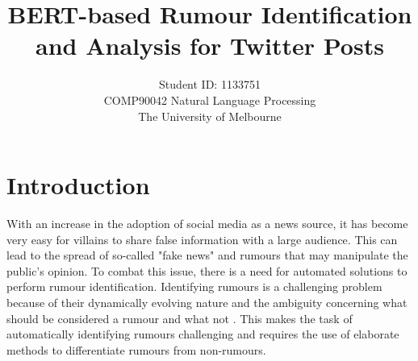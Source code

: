 \documentclass[11pt,a4paper]{article}
\title{BERT-based Rumour Identification and Analysis for Twitter Posts}
\author{ Student ID: 1133751 \\
 COMP90042 Natural Language Processing \\
 The University of Melbourne
}
\date{}
\begin{document}
\maketitle

\section{Introduction}
With an increase in the adoption of social media as a news source, it has become very easy for villains to share false information with a large audience. This can lead to the spread of so-called "fake news" and rumours that may manipulate the public's opinion. To combat this issue, there is a need for automated solutions to perform rumour identification.
\newline
Identifying rumours is a challenging problem because of their dynamically evolving nature and the ambiguity concerning what should be considered a rumour and what not \citep{RN675}. This makes the task of automatically identifying rumours challenging and requires the use of elaborate methods to differentiate rumours from non-rumours. 
\end{document}
